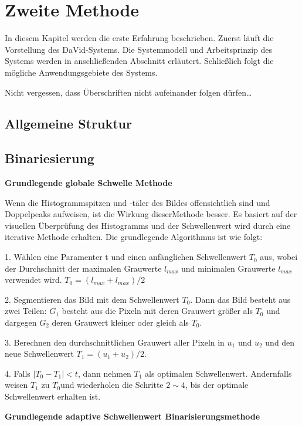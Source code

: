 \chapter{Zweite Methode} \label{cha:ZweiteMethode}

In diesem Kapitel werden die erste Erfahrung beschrieben. Zuerst läuft die Vorstellung des DaVid-Systems. Die Systemmodell und Arbeitsprinzip des Systems werden in anschließenden Abschnitt erläutert. Schließlich folgt die mögliche Anwendungsgebiete des Systems.

Nicht vergessen, dass Überschriften nicht aufeinander folgen dürfen\ldots

\section{Allgemeine Struktur}


\section{Binariesierung}

\textbf{Grundlegende globale Schwelle Methode}

Wenn die Histogrammspitzen und -täler des Bildes offensichtlich sind und Doppelpeaks aufweisen, ist die Wirkung dieserMethode besser. Es basiert auf der visuellen Überprüfung des Histogramms und der Schwellenwert wird durch eine iterative Methode erhalten. Die grundlegende Algorithmus ist wie folgt:

1. Wählen eine Paramenter t und einen anfänglichen Schwellenwert $ T_{0} $ aus, wobei der Durchschnitt der maximalen Grauwerte $ l_{max} $ und minimalen Grauwerte  $ l_{max} $ verwendet wird. $ T_{0} = (l_{max}+l_{max})/2 $

2. Segmentieren das Bild mit dem Schwellenwert $ T_{0} $. Dann das Bild besteht aus zwei Teilen: $ G_{1} $ besteht aus die Pixeln mit deren Grauwert größer als $ T_{0} $ und dargegen $ G_{2} $ deren Grauwert kleiner oder gleich als $ T_{0} $.

3. Berechnen den durchschnittlichen Grauwert aller Pixeln in $ u_{1} $ und $ u_{2} $ und den neue Schwellenwert $ T_{1} = (u_{1}+u_{2})/2 $.

4. Falls $ |T_{0} - T_{1}| < t $, dann nehmen $ T_{1} $ als optimalen Schwellenwert. Andernfalls weisen $ T_{1} $ zu $ T_{0} $und wiederholen die Schritte $ 2\sim4 $, bis der optimale Schwellenwert erhalten ist.

\textbf{Grundlegende adaptive Schwellenwert Binarisierungsmethode}

